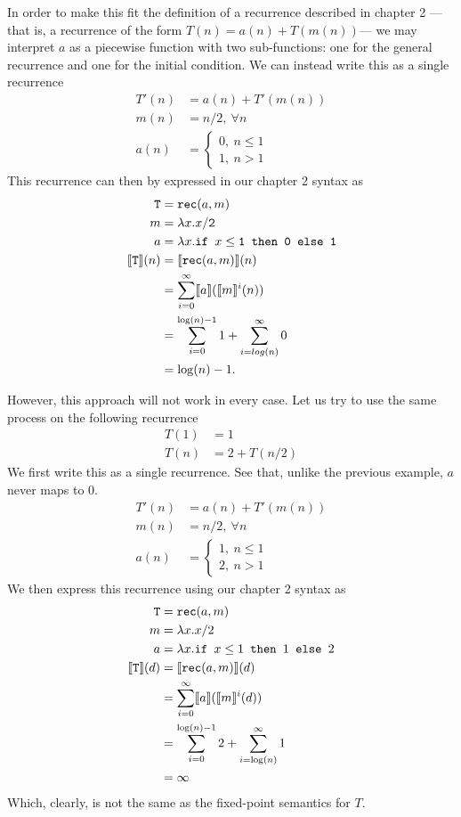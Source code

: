  In order to make this fit the definition of a recurrence described in 
chapter 2 --- that is, a recurrence of the form $T(n) = a(n) + T(m(n))$--- we may interpret $a$ as a 
piecewise function with two sub-functions: one for the general recurrence and one for the initial condition.
We can instead write this as a single recurrence
\begin{align*}
T'(n) &= a(n) + T'(m(n)) \\
m(n) &= n/2, \ \forall n \\ 
a(n) &=
\begin{cases} 
0, \ n \leq 1 \\
1, \ n > 1
\end{cases}
\end{align*} 
This recurrence can then by expressed in our chapter 2 syntax as 
\begin{align*}
\texttt{T} &= \texttt{rec}(a,m) \\
m &= \lambda x.x/\texttt{2} \\
a &= \lambda x.\texttt{if } x\leq\texttt{1} \texttt{ then } \texttt{0} \texttt{ else } \texttt{1} \\
\llbracket \texttt{T} \rrbracket(n) &= \llbracket \texttt{rec}(a,m) \rrbracket(n) \\
&= \sum_{i=0}^{\infty}\llbracket a \rrbracket(\llbracket m\rrbracket^i(n)) \\
&= \sum_{i=0}^{\log(n)-1} 1 + \sum_{i=log(n)}^{\infty} 0 \\
&= \log(n) - 1.
\end{align*}

However, this approach will not work in every case. Let us try to use the same process on the following recurrence
\begin{align*}
T(1) &= 1 \\
T(n) &= 2 + T(n/2) 
\end{align*}
We first write this as a single recurrence. See that, unlike the previous example, $a$ never maps to $0$.
\begin{align*}
T'(n) &= a(n) + T'(m(n)) \\
m(n) &= n/2, \ \forall n \\ 
a(n) &= 
\begin{cases}
1, \ n \leq 1 \\
2, \ n > 1
\end{cases}
\end{align*}
We then express this recurrence using our chapter 2 syntax as
\begin{align*}
\texttt{T} &= \texttt{rec}(a,m) \\
m &= \lambda x.x/2 \\
a &=\lambda x.\texttt{if } x\leq1 \texttt{ then } 1 \texttt{ else } 2 \\
\llbracket \texttt{T} \rrbracket(d) &= \llbracket \texttt{rec}(a,m) \rrbracket(d) \\
&= \sum_{i=0}^{\infty}\llbracket a \rrbracket(\llbracket m\rrbracket^i(d)) \\
&= \sum_{i=0}^{\log(n)-1} 2 + \sum_{i=\log(n) }^{\infty} 1 \\
&= \infty
\end{align*}
Which, clearly, is not the same as the fixed-point semantics for $T$.

